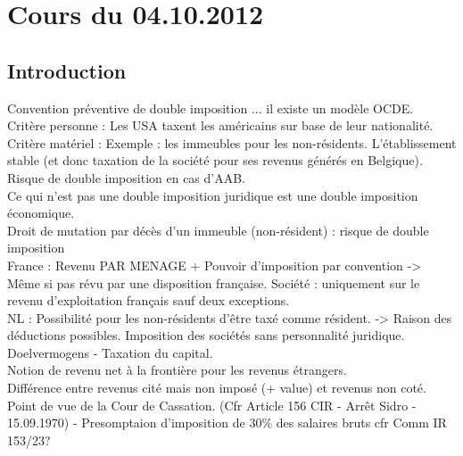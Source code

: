 \documentclass{book}
\begin{document}
\thispagestyle{empty}
\setcounter{page}{0}
\null
\newpage
{} \setcounter{page}{1} 




\tableofcontents



\chapter{Cours du 04.10.2012}
 \setcounter{page}{1} 

\section{Introduction}

Convention préventive de double imposition ... il existe un modèle OCDE.\\

Critère personne : Les USA taxent les américains sur base de leur nationalité.\\

Critère matériel : Exemple : les immeubles pour les non-résidents. L'établissement stable (et donc taxation de la société pour ses revenus générés en Belgique).\\

Risque de double imposition en cas d'AAB. \\

Ce qui n'est pas une double imposition juridique est une double imposition économique.\\

Droit de mutation par décès d'un immeuble (non-résident) : risque de double imposition \\

France : Revenu PAR MENAGE + Pouvoir d'imposition par convention -> Même si pas révu par une disposition française. Société : uniquement sur le revenu d'exploitation français sauf deux exceptions. \\


NL : Possibilité pour les non-résidents d'être taxé comme résident. -> Raison des déductions possibles. Imposition des sociétés sans personnalité juridique. Doelvermogens - Taxation du capital.\\

Notion de revenu net à la frontière pour les revenus étrangers.\\

Différence entre revenus cité mais non imposé (+ value) et revenus non coté. Point de vue de la Cour de Cassation. (Cfr Article 156 CIR - Arrêt Sidro - 15.09.1970) - Presomptaion d'imposition de 30\% des salaires bruts cfr Comm IR 153/23?\\
\end{document}
